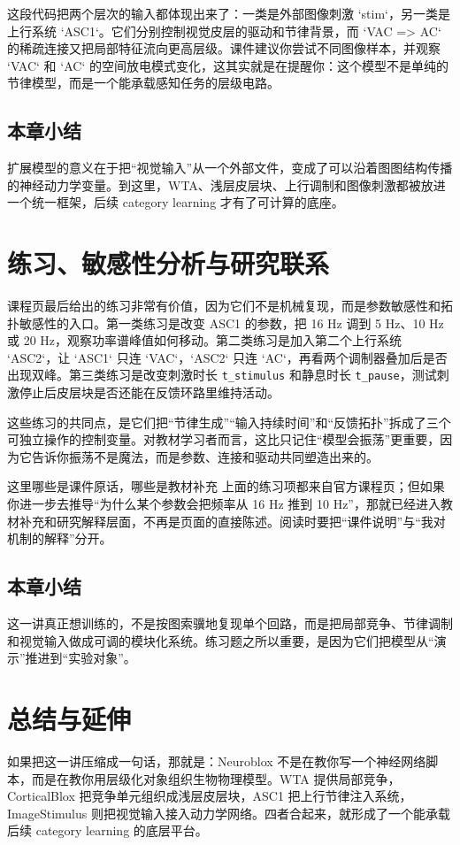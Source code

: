 \documentclass[a4paper]{article}
\begin{document}
这段代码把两个层次的输入都体现出来了：一类是外部图像刺激 `stim`，另一类是上行系统 `ASC1`。它们分别控制视觉皮层的驱动和节律背景，而 `VAC => AC` 的稀疏连接又把局部特征流向更高层级。课件建议你尝试不同图像样本，并观察 `VAC` 和 `AC` 的空间放电模式变化，这其实就是在提醒你：这个模型不是单纯的节律模型，而是一个能承载感知任务的层级电路。

\subsection{本章小结}
扩展模型的意义在于把“视觉输入”从一个外部文件，变成了可以沿着图图结构传播的神经动力学变量。到这里，WTA、浅层皮层块、上行调制和图像刺激都被放进一个统一框架，后续 category learning 才有了可计算的底座。

\section{练习、敏感性分析与研究联系}
课程页最后给出的练习非常有价值，因为它们不是机械复现，而是参数敏感性和拓扑敏感性的入口。第一类练习是改变 ASC1 的参数，把 16 Hz 调到 5 Hz、10 Hz 或 20 Hz，观察功率谱峰值如何移动。第二类练习是加入第二个上行系统 `ASC2`，让 `ASC1` 只连 `VAC`，`ASC2` 只连 `AC`，再看两个调制器叠加后是否出现双峰。第三类练习是改变刺激时长 \texttt{t\_stimulus} 和静息时长 \texttt{t\_pause}，测试刺激停止后皮层块是否还能在反馈环路里维持活动。

这些练习的共同点，是它们把“节律生成”“输入持续时间”和“反馈拓扑”拆成了三个可独立操作的控制变量。对教材学习者而言，这比只记住“模型会振荡”更重要，因为它告诉你振荡不是魔法，而是参数、连接和驱动共同塑造出来的。

\begin{warningbox}{这里哪些是课件原话，哪些是教材补充}
上面的练习项都来自官方课程页；但如果你进一步去推导“为什么某个参数会把频率从 16 Hz 推到 10 Hz”，那就已经进入教材补充和研究解释层面，不再是页面的直接陈述。阅读时要把“课件说明”与“我对机制的解释”分开。
\end{warningbox}

\subsection{本章小结}
这一讲真正想训练的，不是按图索骥地复现单个回路，而是把局部竞争、节律调制和视觉输入做成可调的模块化系统。练习题之所以重要，是因为它们把模型从“演示”推进到“实验对象”。

\section{总结与延伸}
如果把这一讲压缩成一句话，那就是：Neuroblox 不是在教你写一个神经网络脚本，而是在教你用层级化对象组织生物物理模型。WTA 提供局部竞争，CorticalBlox 把竞争单元组织成浅层皮层块，ASC1 把上行节律注入系统，ImageStimulus 则把视觉输入接入动力学网络。四者合起来，就形成了一个能承载后续 category learning 的底层平台。
\end{document}
